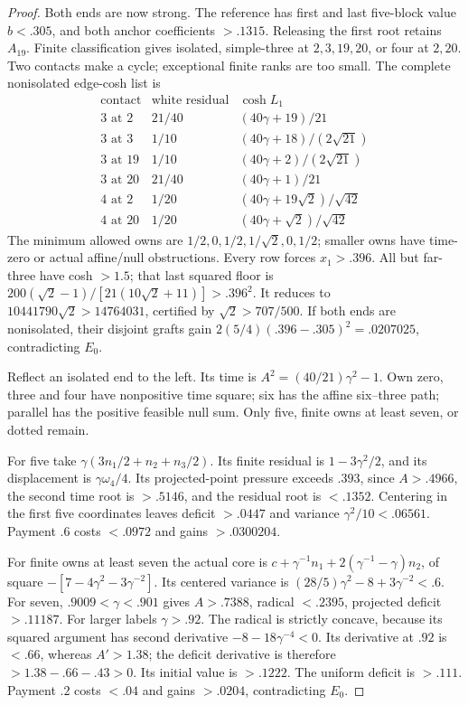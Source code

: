 \begin{proof}
Both ends are now strong. The reference has first and last
five-block value $b<.305$, and both anchor coefficients $>.1315$.
Releasing the first root retains $A_{19}$. Finite classification
gives isolated, simple-three at $2,3,19,20$, or four at $2,20$.
Two contacts make a cycle; exceptional finite ranks are too small.
The complete nonisolated edge-cosh list is
\[
\begin{array}{c|c|c}
\text{contact}&\text{white residual}&\cosh L_1\\\hline
3\text{ at }2&21/40&(40\gamma+19)/21\\
3\text{ at }3&1/10&(40\gamma+18)/(2\sqrt{21})\\
3\text{ at }19&1/10&(40\gamma+2)/(2\sqrt{21})\\
3\text{ at }20&21/40&(40\gamma+1)/21\\
4\text{ at }2&1/20&(40\gamma+19\sqrt2)/\sqrt{42}\\
4\text{ at }20&1/20&(40\gamma+\sqrt2)/\sqrt{42}
\end{array}
\]
The minimum allowed owns are $1/2,0,1/2,1/\sqrt2,0,1/2$;
smaller owns have time-zero or actual affine/null obstructions.
Every row forces $x_1>.396$. All but far-three have cosh $>1.5$;
that last squared floor is
$200(\sqrt2-1)/[21(10\sqrt2+11)]>.396^2$.
It reduces to $10441790\sqrt2>14764031$, certified by
$\sqrt2>707/500$.
If both ends are nonisolated, their disjoint grafts gain
$2(5/4)(.396-.305)^2=.0207025$, contradicting $E_0$.

Reflect an isolated end to the left. Its time is
$A^2=(40/21)\gamma^2-1$.
Own zero, three and four have nonpositive time square; six has
the affine six--three path; parallel has the positive feasible
null sum. Only five, finite owns at least seven, or dotted remain.

For five take $\gamma(3n_1/2+n_2+n_3/2)$.
Its finite residual is $1-3\gamma^2/2$, and its displacement
is $\gamma\omega_4/4$. Its projected-point pressure exceeds
$.393$, since $A>.4966$, the second time root is $>.5146$,
and the residual root is $<.1352$.
Centering in the first five coordinates leaves deficit $>.0447$
and variance $\gamma^2/10<.06561$. Payment $.6$ costs
$<.0972$ and gains $>.0300204$.

For finite owns at least seven the actual core is
$c+\gamma^{-1}n_1+2(\gamma^{-1}-\gamma)n_2$,
of square $-[7-4\gamma^2-3\gamma^{-2}]$.
Its centered variance is $(28/5)\gamma^2-8+3\gamma^{-2}<.6$.
For seven, $.9009<\gamma<.901$ gives $A>.7388$, radical
$<.2395$, projected deficit $>.11187$.
For larger labels $\gamma>.92$. The radical is strictly
concave, because its squared argument has second derivative
$-8-18\gamma^{-4}<0$. Its derivative at $.92$ is $<.66$,
whereas $A'>1.38$; the deficit derivative is therefore
$>1.38-.66-.43>0$. Its initial value is $>.1222$.
The uniform deficit is $>.111$. Payment $.2$ costs $<.04$
and gains $>.0204$, contradicting $E_0$.


\end{proof}
